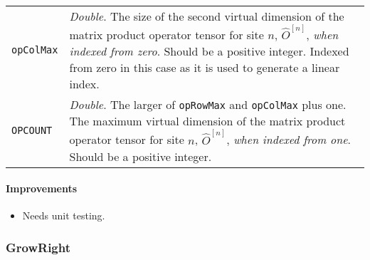 \begin{longtabu}{X[1,l]X[4,l]}
 \lstinline$opColMax$ & \emph{Double}. The size of the second virtual dimension of the matrix product operator tensor for site \(n\), \(\hat{O}^{[n]}\), \emph{when indexed from zero}. Should be a positive integer. Indexed from zero in this case as it is used to generate a linear index. \\
 \lstinline$OPCOUNT$ & \emph{Double}. The larger of \lstinline$opRowMax$ and \lstinline$opColMax$ plus one. The maximum virtual dimension of the matrix product operator tensor for site \(n\), \(\hat{O}^{[n]}\), \emph{when indexed from one}. Should be a positive integer. \\
 \hline
 \end{longtabu}
 \paragraph{Improvements}
 \begin{itemize}
 \item Needs unit testing.
 \end{itemize}
 
 \subsubsection{GrowRight}
